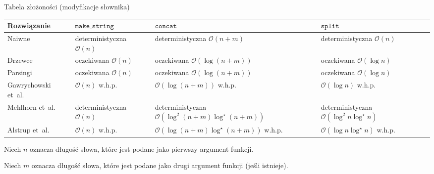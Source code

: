 \documentclass[polish]{beamer}
\begin{document}
\begin{frame}{Tabela złożoności (modyfikacje słownika)}
    \begin{lrbox}{\firstbox}
        \begin{tabular}{ | m{3.3cm} | >{\centering\arraybackslash}m{2.8cm} | >{\centering\arraybackslash}m{4.5cm} | >{\centering\arraybackslash}m{2.8cm} | }
            \hline
            Rozwiązanie & $\texttt{make\_string}$ & $\texttt{concat}$ & $\texttt{split}$ \\
            \hline
            Naiwne & deterministyczna $\mathcal{O}(n)$ & deterministyczna $\mathcal{O}(n + m)$ & deterministyczna $\mathcal{O}(n)$ \\ 
            \hline
            Drzewce & oczekiwana $\mathcal{O}(n)$ & oczekiwana $\mathcal{O}(\log(n + m))$ & oczekiwana $\mathcal{O}(\log n)$ \\
            \hline
            Parsingi & oczekiwana $\mathcal{O}(n)$ & oczekiwana $\mathcal{O}(\log(n + m))$ & oczekiwana $\mathcal{O}(\log n)$ \\
            \hline
            Gawrychowski et~al. & $\mathcal{O}(n)$ w.h.p. & $\mathcal{O}(\log(n + m))$ w.h.p. & $\mathcal{O}(\log n)$ w.h.p. \\
            \hline
            Mehlhorn et~al. & deterministyczna $\mathcal{O}(n)$ & deterministyczna $\mathcal{O}(\log^2(n + m)\log^\star(n + m))$ & deterministyczna $\mathcal{O}(\log^2 n \log^\star n)$ \\
            \hline 
            Alstrup et~al. & $\mathcal{O}(n)$ w.h.p. & $\mathcal{O}(\log(n + m)\log^\star(n + m))$ w.h.p. & $\mathcal{O}(\log n \log^\star n)$ w.h.p.\\
            \hline
        \end{tabular}
    \end{lrbox}
    \begin{block}{}
        Niech $n$ oznacza długość słowa, które jest podane jako pierwszy argument funkcji.
    \end{block}
    \pause
    \begin{block}{}
        Niech $m$ oznacza długość słowa, które jest podane jako drugi argument funkcji (jeśli istnieje).
    \end{block}
    \pause
    \begin{center}
        \scalebox{0.8}{\usebox{\firstbox}}
    \end{center}
\end{frame}

\newsavebox{\secondbox}
\end{document}

